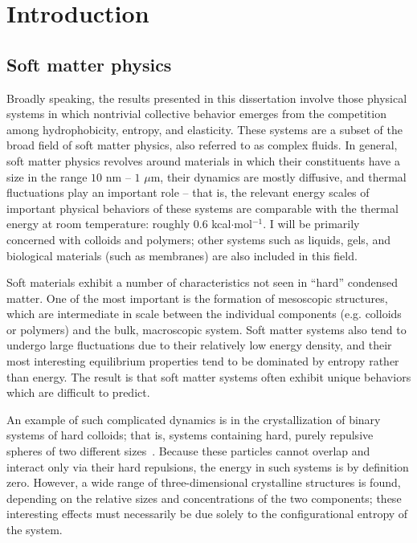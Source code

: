 \chapter{Introduction}
\label{chap:intro}

\section{Soft matter physics}\label{sec:softmatt}

Broadly speaking, the results presented in this dissertation involve those physical systems in which nontrivial collective behavior emerges from the competition among hydrophobicity, entropy, and elasticity.
These systems are a subset of the broad field of soft matter physics, also referred to as complex fluids.
In general, soft matter physics revolves around materials in which their constituents have a size in the range $10$ nm -- $1$ $\mu$m, their dynamics are mostly diffusive, and thermal fluctuations play an important role -- that is, the relevant energy scales of important physical behaviors of these systems are comparable with the thermal energy at room temperature: roughly $0.6$ kcal$\cdot$mol$^{-1}$.
I will be primarily concerned with colloids and polymers; other systems such as liquids, gels, and biological materials (such as membranes) are also included in this field.

Soft materials exhibit a number of characteristics not seen in ``hard'' condensed matter.
One of the most important is the formation of mesoscopic structures, which are intermediate in scale between the individual components (e.g. colloids or polymers) and the bulk, macroscopic system.
Soft matter systems also tend to undergo large fluctuations due to their relatively low energy density, and their most interesting equilibrium properties tend to be dominated by entropy rather than energy.
The result is that soft matter systems often exhibit unique behaviors which are difficult to predict.

An example of such complicated dynamics is in the crystallization of binary systems of hard colloids; that is, systems containing hard, purely repulsive spheres of two different sizes~\cite{FrenkelNatMat}.
Because these particles cannot overlap and interact only via their hard repulsions, the energy in such systems is by definition zero.
However, a wide range of three-dimensional crystalline structures is found, depending on the relative sizes and concentrations of the two components; these interesting effects must necessarily be due solely to the configurational entropy of the system.

